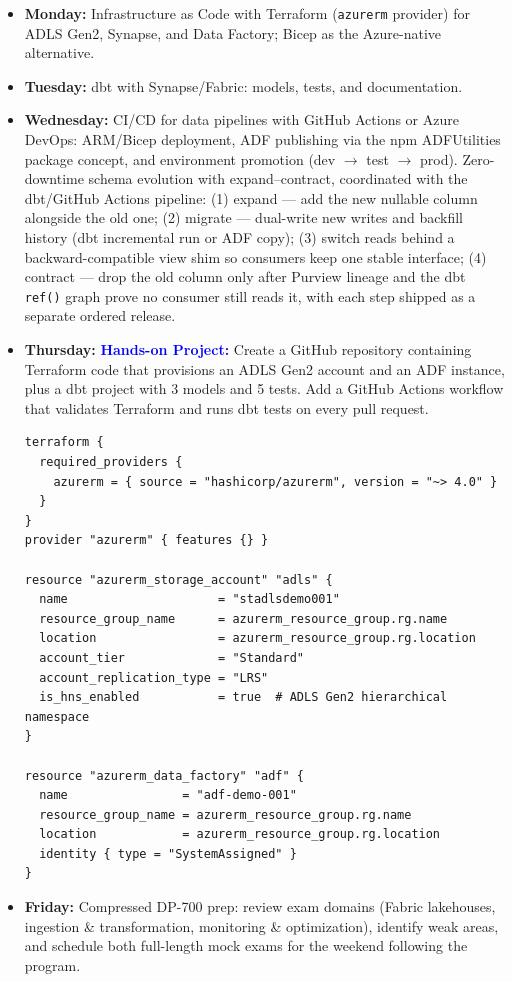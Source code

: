 \documentclass[11pt, a4paper]{article}
\newcommand{\project}[1]{\vspace{1mm}\noindent\textbf{\textcolor{blue}{Hands-on Project:}} #1}
\newcommand{\dayitem}[2]{\item \textbf{#1:} #2}
\begin{document}
\begin{itemize}[label=-]
    \dayitem{Monday}{Infrastructure as Code with Terraform (\texttt{azurerm} provider) for ADLS Gen2, Synapse, and Data Factory; Bicep as the Azure-native alternative.}
    \dayitem{Tuesday}{dbt with Synapse/Fabric: models, tests, and documentation.}
    \dayitem{Wednesday}{CI/CD for data pipelines with GitHub Actions or Azure DevOps: ARM/Bicep deployment, ADF publishing via the npm ADFUtilities package concept, and environment promotion (dev $\rightarrow$ test $\rightarrow$ prod). Zero-downtime schema evolution with expand--contract, coordinated with the dbt/GitHub Actions pipeline: (1) expand --- add the new nullable column alongside the old one; (2) migrate --- dual-write new writes and backfill history (dbt incremental run or ADF copy); (3) switch reads behind a backward-compatible view shim so consumers keep one stable interface; (4) contract --- drop the old column only after Purview lineage and the dbt \texttt{ref()} graph prove no consumer still reads it, with each step shipped as a separate ordered release.}
    \dayitem{Thursday}{\project{Create a GitHub repository containing Terraform code that provisions an ADLS Gen2 account and an ADF instance, plus a dbt project with 3 models and 5 tests. Add a GitHub Actions workflow that validates Terraform and runs dbt tests on every pull request.}}
\begin{lstlisting}[language={}]
terraform {
  required_providers {
    azurerm = { source = "hashicorp/azurerm", version = "~> 4.0" }
  }
}
provider "azurerm" { features {} }

resource "azurerm_storage_account" "adls" {
  name                     = "stadlsdemo001"
  resource_group_name      = azurerm_resource_group.rg.name
  location                 = azurerm_resource_group.rg.location
  account_tier             = "Standard"
  account_replication_type = "LRS"
  is_hns_enabled           = true  # ADLS Gen2 hierarchical namespace
}

resource "azurerm_data_factory" "adf" {
  name                = "adf-demo-001"
  resource_group_name = azurerm_resource_group.rg.name
  location            = azurerm_resource_group.rg.location
  identity { type = "SystemAssigned" }
}
\end{lstlisting}
    \dayitem{Friday}{Compressed DP-700 prep: review exam domains (Fabric lakehouses, ingestion \& transformation, monitoring \& optimization), identify weak areas, and schedule both full-length mock exams for the weekend following the program.}
\end{itemize}
\end{document}
